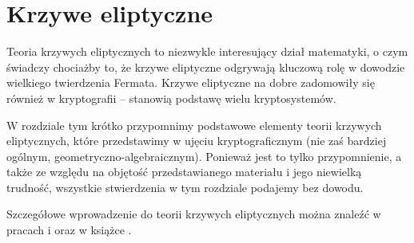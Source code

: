 \chapter{Krzywe eliptyczne}

\noindent
Teoria krzywych eliptycznych to niezwykle interesujący dział matematyki,
o czym świadczy chociażby to,
że krzywe eliptyczne odgrywają kluczową rolę
w dowodzie wielkiego twierdzenia Fermata.
Krzywe eliptyczne na dobre zadomowiły się również w kryptografii --
stanowią podstawę wielu kryptosystemów.

\noindent
W rozdziale tym krótko przypomnimy
podstawowe elementy teorii krzywych eliptycznych,
które przedstawimy w ujęciu kryptograficznym
(nie zaś bardziej ogólnym, geometryczno-algebraicznym).
Ponieważ jest to tylko przypomnienie,
a także ze względu na objętość przedstawianego materiału
i jego niewielką trudność,
wszystkie stwierdzenia w tym rozdziale podajemy bez dowodu.

\noindent
Szczegółowe wprowadzenie do teorii krzywych eliptycznych
można znaleźć w pracach \cite{ecintro1} i \cite{ecintro2}
oraz w książce \cite{silverman}.






